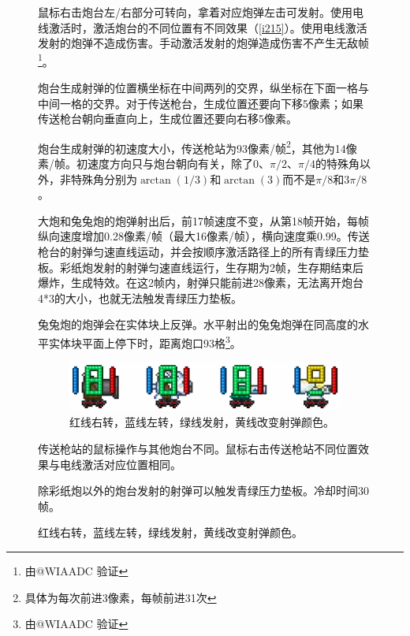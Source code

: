 \begin{figure}[!ht]
鼠标右击炮台左/右部分可转向，拿着对应炮弹左击可发射。使用电线激活时，激活炮台的不同位置有不同效果（\autoref{i215}）。使用电线激活发射的炮弹不造成伤害。手动激活发射的炮弹造成伤害不产生无敌帧\footnote{由@WIAADC 验证}。

炮台生成射弹的位置横坐标在中间两列的交界，纵坐标在下面一格与中间一格的交界。对于传送枪台，生成位置还要向下移5像素；如果传送枪台朝向垂直向上，生成位置还要向右移5像素。

炮台生成射弹的初速度大小，传送枪站为93像素/帧\footnote{具体为每次前进3像素，每帧前进31次}，其他为14像素/帧。初速度方向只与炮台朝向有关，除了0、$\pi/2$、$\pi/4$的特殊角以外，非特殊角分别为$\arctan(1/3)$和$\arctan(3)$而不是$\pi/8$和$3\pi/8$。

大炮和兔兔炮的炮弹射出后，前17帧速度不变，从第18帧开始，每帧纵向速度增加0.28像素/帧（最大16像素/帧），横向速度乘0.99。传送枪台的射弹匀速直线运动，并会按顺序激活路径上的所有青绿压力垫板。彩纸炮发射的射弹匀速直线运行，生存期为2帧，生存期结束后爆炸，生成特效。在这2帧内，射弹只能前进28像素，无法离开炮台4*3的大小，也就无法触发青绿压力垫板。

兔兔炮的炮弹会在实体块上反弹。水平射出的兔兔炮弹在同高度的水平实体块平面上停下时，距离炮口93格\footnote{由@WIAADC 验证}。

\begin{figure}[!ht]
\centering
\includegraphics{images/215.png}
\caption{红线右转，蓝线左转，绿线发射，黄线改变射弹颜色。}
\label{i215}
\end{figure}

传送枪站的鼠标操作与其他炮台不同。鼠标右击传送枪站不同位置效果与电线激活对应位置相同。

除彩纸炮以外的炮台发射的射弹可以触发青绿压力垫板。冷却时间30帧。


\end{figure}
